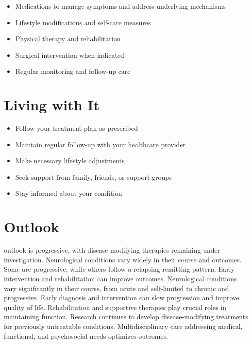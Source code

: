 \begin{itemize}[noitemsep]
  \item Medications to manage symptoms and address underlying mechanisms
  \item Lifestyle modifications and self-care measures
  \item Physical therapy and rehabilitation
  \item Surgical intervention when indicated
  \item Regular monitoring and follow-up care
\end{itemize}
\section{Living with It}
\begin{itemize}[noitemsep]
  \item Follow your treatment plan as prescribed
  \item Maintain regular follow-up with your healthcare provider
  \item Make necessary lifestyle adjustments
  \item Seek support from family, friends, or support groups
  \item Stay informed about your condition
\end{itemize}
\section{Outlook}
outlook is progressive, with disease-modifying therapies remaining under investigation. Neurological conditions vary widely in their course and outcomes. Some are progressive, while others follow a relapsing-remitting pattern. Early intervention and rehabilitation can improve outcomes. Neurological conditions vary significantly in their course, from acute and self-limited to chronic and progressive. Early diagnosis and intervention can slow progression and improve quality of life. Rehabilitation and supportive therapies play crucial roles in maintaining function. Research continues to develop disease-modifying treatments for previously untreatable conditions. Multidisciplinary care addressing medical, functional, and psychosocial needs optimizes outcomes.
